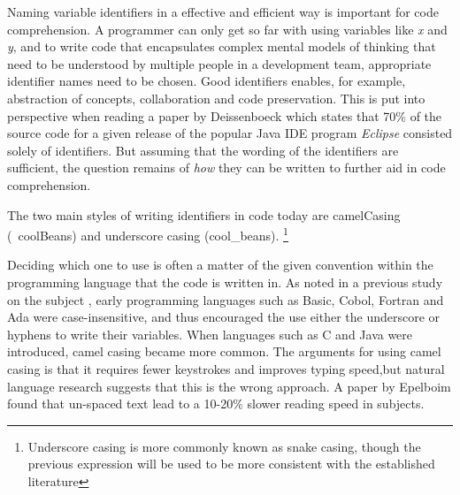\iffalse
\begin{itemize}
	\item Identifier names are important
	\item We have two identifier styles
	\item Some history 
	\item Two other studies
	\item Some background on them
	\item Reference all terms introduced
\end{itemize}
\fi

Naming variable identifiers in a effective and efficient way is important for code comprehension. A programmer can only get so far with using variables like \textit{x} and \textit{y}, and to write code that encapsulates complex mental models of thinking that need to be understood by multiple people in a development team, appropriate identifier names need to be chosen. Good identifiers enables, for example, abstraction of concepts, collaboration and code preservation. This is put into perspective when reading a paper by Deissenboeck \etal \cite{Concise-Naming} which states that 70\% of the source code for a given release of the popular Java IDE program \textit{Eclipse} consisted solely of identifiers. But assuming that the wording of the identifiers are sufficient, the question remains of \textit{how} they can be written to further aid in code comprehension.

The two main styles of writing identifiers in code today are camelCasing (\eg ~coolBeans) and underscore casing (\eg cool\_beans). \footnote{Underscore casing is more commonly known as snake casing, though the previous expression will be used to be more consistent with the established literature}

Deciding which one to use is often a matter of the given convention within the programming language that the code is written in. As noted in a previous study on the subject \cite{eye-tracking-study}, early programming languages such as Basic, Cobol, Fortran and Ada were case-insensitive, and thus encouraged the use either the underscore or hyphens to write their variables. When languages such as C and Java were introduced, camel casing became more common.
The arguments for using camel casing is that it requires fewer keystrokes and improves typing speed,but natural language research suggests that this is the wrong approach. A paper by Epelboim \etal \cite{Fillers-in-text} found that un-spaced text lead to a 10-20\% slower reading speed in subjects.





